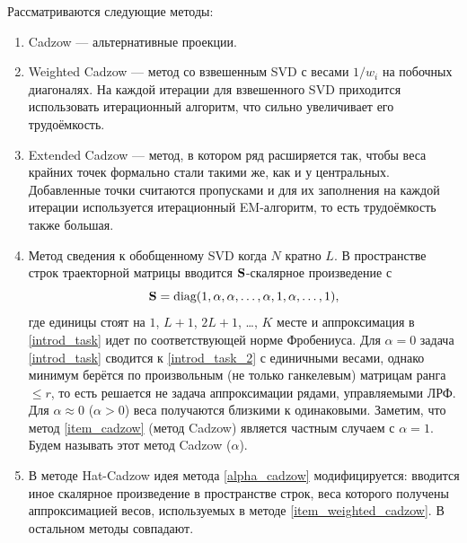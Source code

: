 \documentclass[12pt,a4paper,fleqn,leqno]{article}
\begin{document}
Рассматриваются следующие методы:
\begin{enumerate}
\item \label{item_cadzow}Cadzow --- альтернативные проекции.
\item \label{item_weighted_cadzow}Weighted Cadzow --- метод со взвешенным SVD с весами $1/w_i$ на побочных диагоналях. На каждой итерации для взвешенного SVD приходится использовать итерационный алгоритм, что сильно увеличивает его трудоёмкость.
\item Extended Cadzow --- метод, в котором ряд расширяется так, чтобы веса крайних точек формально стали такими же, как и у центральных. Добавленные точки считаются пропусками и для их заполнения на каждой итерации используется итерационный EM-алгоритм, то есть трудоёмкость также большая.
\item \label{alpha_cadzow} Метод сведения к обобщенному SVD когда $N$ кратно $L$. В пространстве строк траекторной матрицы вводится $\mathbf{S}$-скалярное произведение с
\begin{equation*}
\mathbf{S} = \text{diag}(1, \alpha, \alpha, \ldots, \alpha, 1, \alpha, \ldots, 1),
\end{equation*}
где единицы стоят на $1$, $L + 1$, $2L + 1$, \ldots , $K$ месте и аппроксимация в \eqref{introd_task} идет по соответствующей норме Фробениуса. Для $\alpha = 0$ задача \eqref{introd_task} сводится к \eqref{introd_task_2} с единичными весами, однако минимум берётся по произвольным (не только ганкелевым) матрицам ранга $\le r$, то есть решается не задача аппроксимации рядами, управляемыми ЛРФ. Для $\alpha \approx 0$ ($\alpha > 0$) веса получаются близкими к одинаковыми. Заметим, что метод \ref{item_cadzow} (метод Cadzow) является частным случаем с $\alpha = 1$. Будем называть этот метод Cadzow ($\alpha$).
\item В методе Hat-Cadzow идея метода \ref{alpha_cadzow} модифицируется: вводится иное скалярное произведение в пространстве строк, веса которого получены аппроксимацией весов, используемых в методе \ref{item_weighted_cadzow}. В остальном методы совпадают.
\end{enumerate}

\end{document}
